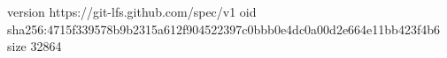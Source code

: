 version https://git-lfs.github.com/spec/v1
oid sha256:4715f339578b9b2315a612f904522397c0bbb0e4dc0a00d2e664e11bb423f4b6
size 32864
